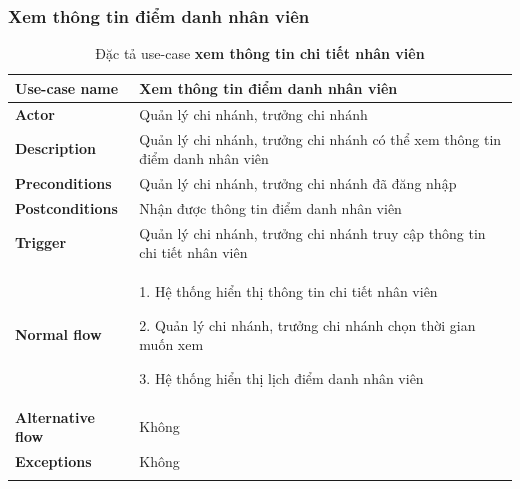         \newpage
        \subsubsection{Xem thông tin điểm danh nhân viên}
        {
\setlength\extrarowheight{6pt}
            \begin{longtable}{| p{} | p{} |} 
                \hline
                    \textbf{Use-case name} 
                & 
                    Xem thông tin điểm danh nhân viên
                \\
                \hline
                    \textbf{Actor} 
                & 
                    Quản lý chi nhánh, trưởng chi nhánh
                \\
                \hline
                    \textbf{Description} 
                & 
                    Quản lý chi nhánh, trưởng chi nhánh có thể xem thông tin điểm danh nhân viên
                \\
                \hline
                    \textbf{Preconditions} 
                &
                    Quản lý chi nhánh, trưởng chi nhánh đã đăng nhập 
                \\
                \hline
                    \textbf{Postconditions} 
                & 
                    Nhận được thông tin điểm danh nhân viên
                \\
                \hline
                    \textbf{Trigger} 
                & 
                    Quản lý chi nhánh, trưởng chi nhánh truy cập thông tin chi tiết nhân viên
                \\
                \hline
                \begin{flushleft}
                    \textbf{Normal flow}
                \end{flushleft}
                & 
                1. Hệ thống hiển thị thông tin chi tiết nhân viên
                
                    2. Quản lý chi nhánh, trưởng chi nhánh chọn thời gian muốn xem
                    
                    3. Hệ thống hiển thị lịch điểm danh nhân viên
                \\
                \hline
                    \textbf{Alternative flow}
                &
                    Không
                \\
                \hline
                    \textbf{Exceptions} 
                &
                    Không
                \\
                \hline
                \caption{Đặc tả use-case \textbf{xem thông tin chi tiết nhân viên}}
            \end{longtable}
        }
    
